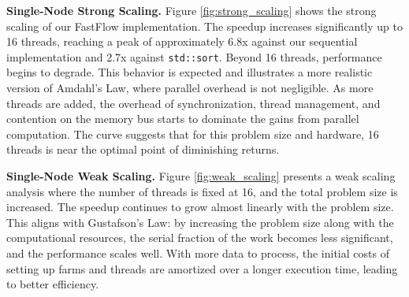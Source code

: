 \documentclass[10pt]{article}
\newcommand{\code}[1]{\texttt{#1}}
\begin{document}
\textbf{Single-Node Strong Scaling.} Figure \ref{fig:strong_scaling} shows the strong scaling of our FastFlow implementation. The speedup increases significantly up to 16 threads, reaching a peak of approximately 6.8x against our sequential implementation and 2.7x against \code{std::sort}. Beyond 16 threads, performance begins to degrade. This behavior is expected and illustrates a more realistic version of Amdahl's Law, where parallel overhead is not negligible. As more threads are added, the overhead of synchronization, thread management, and contention on the memory bus starts to dominate the gains from parallel computation. The curve suggests that for this problem size and hardware, 16 threads is near the optimal point of diminishing returns.

\textbf{Single-Node Weak Scaling.} Figure \ref{fig:weak_scaling} presents a weak scaling analysis where the number of threads is fixed at 16, and the total problem size is increased. The speedup continues to grow almost linearly with the problem size. This aligns with Gustafson's Law: by increasing the problem size along with the computational resources, the serial fraction of the work becomes less significant, and the performance scales well. With more data to process, the initial costs of setting up farms and threads are amortized over a longer execution time, leading to better efficiency.
\end{document}
